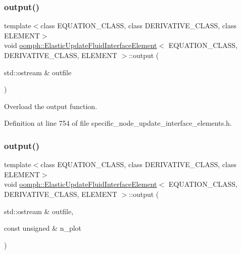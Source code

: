 \subsubsection{\texorpdfstring{output()}{output()}\hspace{0.1cm}{\footnotesize\ttfamily [1/4]}}
{\footnotesize\ttfamily template$<$class E\+Q\+U\+A\+T\+I\+O\+N\+\_\+\+C\+L\+A\+SS, class D\+E\+R\+I\+V\+A\+T\+I\+V\+E\+\_\+\+C\+L\+A\+SS, class E\+L\+E\+M\+E\+NT$>$ \\
void \hyperlink{classoomph_1_1ElasticUpdateFluidInterfaceElement}{oomph\+::\+Elastic\+Update\+Fluid\+Interface\+Element}$<$ E\+Q\+U\+A\+T\+I\+O\+N\+\_\+\+C\+L\+A\+SS, D\+E\+R\+I\+V\+A\+T\+I\+V\+E\+\_\+\+C\+L\+A\+SS, E\+L\+E\+M\+E\+NT $>$\+::output (\begin{DoxyParamCaption}\item[{std\+::ostream \&}]{outfile }\end{DoxyParamCaption})\hspace{0.3cm}{\ttfamily [inline]}}



Overload the output function. 



Definition at line 754 of file specific\+\_\+node\+\_\+update\+\_\+interface\+\_\+elements.\+h.

\mbox{\label{classoomph_1_1ElasticUpdateFluidInterfaceElement_ac193aa64a8223a96e4148a5af456fb64}} 
\subsubsection{\texorpdfstring{output()}{output()}\hspace{0.1cm}{\footnotesize\ttfamily [2/4]}}
{\footnotesize\ttfamily template$<$class E\+Q\+U\+A\+T\+I\+O\+N\+\_\+\+C\+L\+A\+SS, class D\+E\+R\+I\+V\+A\+T\+I\+V\+E\+\_\+\+C\+L\+A\+SS, class E\+L\+E\+M\+E\+NT$>$ \\
void \hyperlink{classoomph_1_1ElasticUpdateFluidInterfaceElement}{oomph\+::\+Elastic\+Update\+Fluid\+Interface\+Element}$<$ E\+Q\+U\+A\+T\+I\+O\+N\+\_\+\+C\+L\+A\+SS, D\+E\+R\+I\+V\+A\+T\+I\+V\+E\+\_\+\+C\+L\+A\+SS, E\+L\+E\+M\+E\+NT $>$\+::output (\begin{DoxyParamCaption}\item[{std\+::ostream \&}]{outfile,  }\item[{const unsigned \&}]{n\+\_\+plot }\end{DoxyParamCaption})\hspace{0.3cm}{\ttfamily [inline]}}



